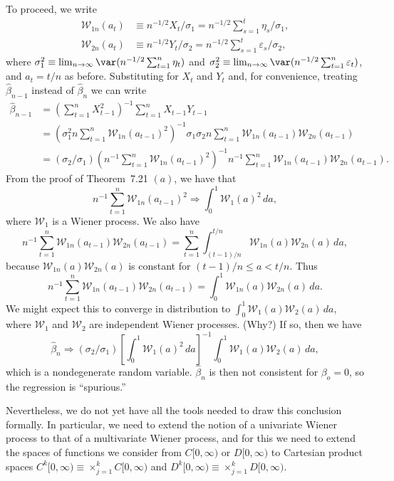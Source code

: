 To proceed, we write
\begin{align*}
\mathcal{W}_{1n}(a_t) &\equiv n^{-1/2}X_t/\sigma_1 = n^{-1/2}\sum_{s=1}^{t} \eta_s / \sigma_1, \\
\mathcal{W}_{2n}(a_t) &\equiv n^{-1/2}Y_t/\sigma_2 = n^{-1/2}\sum_{s=1}^{t} \varepsilon_s / \sigma_2,
\end{align*}
where $\sigma_1^2 \equiv \lim_{n\to\infty} \var(n^{-1/2}\sum_{t=1}^{n} \eta_t)$ and $\sigma_2^2 \equiv \lim_{n\to\infty} \var(n^{-1/2}\sum_{t=1}^{n} \varepsilon_t)$, and $a_t = t/n$ as before. Substituting for $X_t$ and $Y_t$ and, for convenience, treating $\hat{\beta}_{n-1}$ instead of $\hat{\beta}_n$ we can write
\begin{align*}
\hat{\beta}_{n-1} &= \left(\sum_{t=1}^{n} X_{t-1}^2\right)^{-1}\sum_{t=1}^{n} X_{t-1}Y_{t-1} \\
&= \left(\sigma_1^2 n\sum_{t=1}^{n} \mathcal{W}_{1n}(a_{t-1})^2\right)^{-1} \sigma_1 \sigma_2 n \sum_{t=1}^{n} \mathcal{W}_{1n}(a_{t-1})\mathcal{W}_{2n}(a_{t-1}) \\
&= (\sigma_2/\sigma_1)\left(n^{-1}\sum_{t=1}^{n} \mathcal{W}_{1n}(a_{t-1})^2\right)^{-1} n^{-1}\sum_{t=1}^{n} \mathcal{W}_{1n}(a_{t-1})\mathcal{W}_{2n}(a_{t-1}).
\end{align*}
From the proof of Theorem~7.21 $(a)$, we have that
\[
n^{-1}\sum_{t=1}^{n} \mathcal{W}_{1n}(a_{t-1})^2 \Rightarrow \int_0^1 \mathcal{W}_1(a)^2\,da,
\]
where $\mathcal{W}_1$ is a Wiener process. We also have
\[
n^{-1}\sum_{t=1}^{n} \mathcal{W}_{1n}(a_{t-1})\mathcal{W}_{2n}(a_{t-1}) = \sum_{t=1}^{n}\int_{(t-1)/n}^{t/n} \mathcal{W}_{1n}(a)\mathcal{W}_{2n}(a)\,da,
\]
because $\mathcal{W}_{1n}(a)\mathcal{W}_{2n}(a)$ is constant for $(t-1)/n \leq a < t/n$. Thus
\[
n^{-1}\sum_{t=1}^{n} \mathcal{W}_{1n}(a_{t-1})\mathcal{W}_{2n}(a_{t-1}) = \int_0^1 \mathcal{W}_{1n}(a)\mathcal{W}_{2n}(a)\,da.
\]
We might expect this to converge in distribution to $\int_0^1 \mathcal{W}_1(a)\mathcal{W}_2(a)\,da$, where $\mathcal{W}_1$ and $\mathcal{W}_2$ are independent Wiener processes. (Why?) If so, then we have
\[
\hat{\beta}_n \Rightarrow (\sigma_2/\sigma_1)\left[\int_0^1 \mathcal{W}_1(a)^2\,da\right]^{-1}\int_0^1 \mathcal{W}_1(a)\mathcal{W}_2(a)\,da,
\]
which is a nondegenerate random variable. $\hat{\beta}_n$ is then not consistent for $\beta_o = 0$, so the regression is ``spurious.''

Nevertheless, we do not yet have all the tools needed to draw this conclusion formally. In particular, we need to extend the notion of a univariate Wiener process to that of a multivariate Wiener process, and for this we need to extend the spaces of functions we consider from $C[0,\infty)$ or $D[0,\infty)$ to Cartesian product spaces $C^k[0,\infty) \equiv \times_{j=1}^{k} C[0,\infty)$ and $D^k[0,\infty) \equiv \times_{j=1}^{k} D[0,\infty)$.

